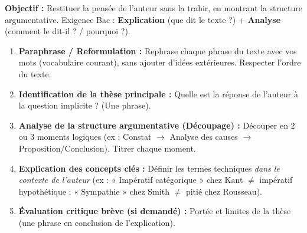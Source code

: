 \documentclass[11pt]{article}
\newcommand{\cle}[1]{{\popxbold\color{popdark}#1}}
\begin{document}
\begin{methode}
\textbf{Objectif :} Restituer la pensée de l'auteur sans la trahir, en montrant la structure argumentative. Exigence Bac : \textbf{Explication} (que dit le texte ?) + \textbf{Analyse} (comment le dit-il ? / pourquoi ?).
\begin{enumerate}
    \item \textbf{Paraphrase / Reformulation :} Rephrase chaque phrase du texte avec vos mots (vocabulaire courant), sans ajouter d'idées extérieures. \cle{Respecter l'ordre du texte}.
    \item \textbf{Identification de la thèse principale :} Quelle est la réponse de l'auteur à la question implicite ? (Une phrase).
    \item \textbf{Analyse de la structure argumentative (Découpage) :} Découper en 2 ou 3 \cle{moments} logiques (ex : Constat $\rightarrow$ Analyse des causes $\rightarrow$ Proposition/Conclusion). Titrer chaque moment.
    \item \textbf{Explication des concepts clés :} Définir les termes techniques \emph{dans le contexte de l'auteur} (ex : « Impératif catégorique » chez Kant $\neq$ impératif hypothétique ; « Sympathie » chez Smith $\neq$ pitié chez Rousseau).
    \item \textbf{Évaluation critique brève (si demandé) :} Portée et limites de la thèse (une phrase en conclusion de l'explication).
\end{enumerate}
\end{methode}
\end{document}
